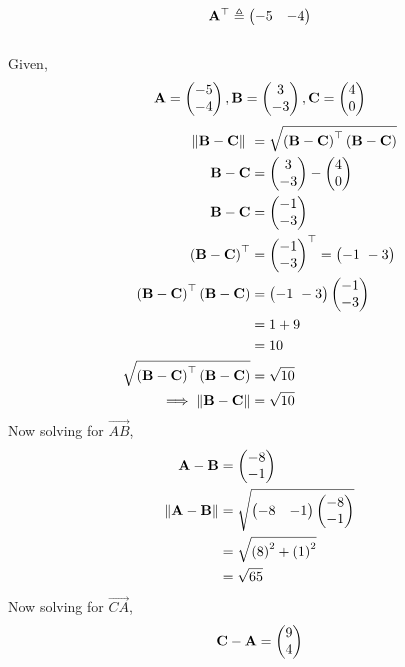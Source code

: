 \documentclass[10pt]{book}
\begin{document}
\begin{enumerate}[label=\thesection.\arabic*.,ref=\thesection.\theenumi]
\begin{align}
\begin{split}
\mathbf{A}^{\top}\triangleq\begin{pmatrix}-5 & -4\end{pmatrix}
\end{split}
\end{align}
\solution \\
Given,\\
                \begin{align}
                \mathbf{A} = \begin{pmatrix}-5 \\ -4\end{pmatrix},
                \mathbf{B} = \begin{pmatrix}3 \\ -3\end{pmatrix},
                \mathbf{C} = \begin{pmatrix}4 \\ 0\end{pmatrix}
                \end{align}
                \begin{align}
                \norm{\vec{B}-\vec{C}} \ &= \sqrt{\brak{\vec{B}-\vec{C}}^{\top}\brak{\vec{B}-\vec{C}}} \\
                \vec{B}-\vec{C} &= \myvec{3 \\ -3} - \myvec{4 \\ 0} \\
                \vec{B}-\vec{C} &= \myvec{-1 \\ -3} \\
                \brak{\vec{B}-\vec{C}}^{\top} &= {\myvec{-1 \\ -3}}^{\top} = \myvec{-1 \ -3} \\
                \brak{\vec{B}-\vec{C}}^{\top}\brak{\vec{B}-\vec{C}} &= \myvec{-1 \ -3} \myvec{-1 \\ -3} \\
                 & = 1 + 9 \\
                 & = 10 \\
                \sqrt{\brak{\vec{B}-\vec{C}}^{\top}\brak{\vec{B}-\vec{C}}} &= \sqrt{10} \\
                \label{eq:geo-norm-bc}
                 \implies \norm{\vec{B}-\vec{C}} &= \sqrt{10}
                \end{align}
Now solving for $\vec{AB}$,
\begin{align}
\vec{A}-\vec{B} &= \myvec{-8\\-1}\\
\norm{\vec{A}-\vec{B}} &= \sqrt{\myvec{-8 & -1}\myvec{-8\\-1}}\\
&= \sqrt{\brak{8}^2 +\brak{1}^2}\\
&=\sqrt{65}
\label{eq:geo-norm-ab}
\end{align}
Now solving for $\vec{CA}$,
    \begin{align}  
    	\vec{C}-\vec{A} &= \myvec{9\\4}\\

\end{align}
\end{enumerate}
\end{document}

